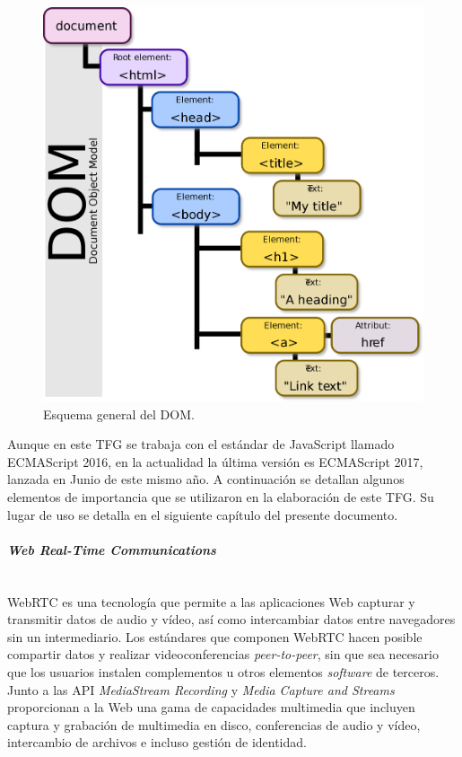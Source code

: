 \begin{figure}[!t]
\begin{center}
\includegraphics[width=0.75\linewidth]{./3_Tecnologias/Img/DOMModel.png}
\end{center}
\caption{Esquema general del DOM.}
\label{DOMModel}
\end{figure}


Aunque en este TFG se trabaja con el estándar de JavaScript llamado ECMAScript 2016, en la actualidad la última versión es ECMAScript 2017, lanzada en Junio de este mismo año. A continuación se detallan algunos elementos de importancia que se utilizaron en la elaboración de este TFG. Su lugar de uso se detalla en el siguiente capítulo del presente documento.

\paragraph{\emph{Web Real-Time Communications}} ~\\

WebRTC es una tecnología que permite a las aplicaciones Web capturar y transmitir datos de audio y vídeo, así como intercambiar datos entre navegadores sin un intermediario. Los estándares que componen WebRTC hacen posible compartir datos y realizar videoconferencias \emph{peer-to-peer}, sin que sea necesario que los usuarios instalen complementos u otros elementos \emph{software} de terceros. Junto a las API \emph{MediaStream Recording} y \emph{Media Capture and Streams} proporcionan a la Web una gama de capacidades multimedia que incluyen captura y grabación de multimedia en disco, conferencias de audio y vídeo, intercambio de archivos e incluso gestión de identidad.

